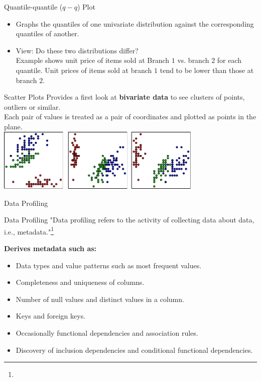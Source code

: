\begin{frame}{Quantile-quantile ($q-q$) Plot}
  \begin{itemize}
  \item Graphs the quantiles of one univariate distribution against the corresponding quantiles of another.
  \item View: Do these two distributions differ?\\
    Example shows unit price of items sold at Branch $1$ vs. branch $2$ for each quantile.  Unit prices of items sold at branch $1$ tend to be lower than those at branch $2$.
  \end{itemize}\vspace{0.5cm}
  \centering
\end{frame}

\begin{frame}{Scatter Plots}
  Provides a first look at \textbf{bivariate data} to see clusters of points, outliers or similar.\\
  Each pair of values is treated as a pair of coordinates and plotted as points in the plane.\\[0.5cm]
  \centering
  \includegraphics[height=3cm]{img/scatterplot.pdf}
\end{frame}

\begin{frame}{Data Profiling}
  \begin{block}{Data Profiling}
    "Data profiling refers to the activity of collecting data about data, i.e., metadata."\footnote{}
  \end{block}

  \textbf{Derives metadata such as:}
  \begin{itemize}
  \item Data types and value patterns such as most frequent values.
  \item Completeness and uniqueness of columns.
  \item Number of null values and distinct values in a column.
  \item Keys and foreign keys.
  \item Occasionally functional dependencies and association rules.
  \item Discovery of inclusion dependencies and conditional functional dependencies.
  \end{itemize}
\end{frame}
